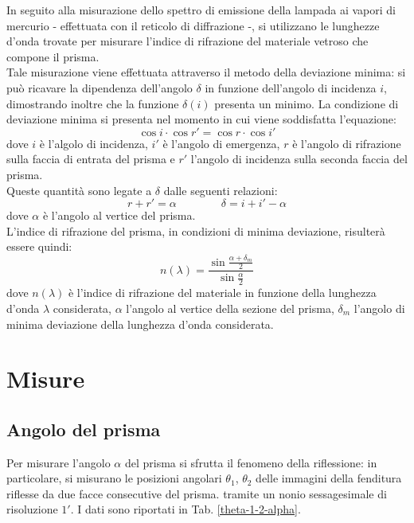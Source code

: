 \documentclass[]{article}
\let\oldsection\section%
\renewcommand{\section}{%
	\renewcommand{\theequation}{\thesection.\arabic{equation}}%
	\oldsection}%
\let\oldsubsection\subsection%
\renewcommand{\subsection}{%
	\renewcommand{\theequation}{\thesubsection.\arabic{equation}}%
	\oldsubsection}%
\begin{document}
    In seguito alla misurazione dello spettro di emissione della lampada ai vapori di mercurio - effettuata con il reticolo di diffrazione -, si utilizzano le lunghezze d'onda trovate per misurare l'indice di rifrazione del materiale vetroso che compone il prisma. \\
    Tale misurazione viene effettuata attraverso il metodo della deviazione minima: si può ricavare la dipendenza dell'angolo $\delta$ in funzione dell'angolo di incidenza $i$, dimostrando inoltre che la funzione $\delta (i)$ presenta un minimo. La condizione di deviazione minima si presenta nel momento in cui viene soddisfatta l'equazione:
    \begin{equation}
        \label{dev_minima}
        \cos i \cdot \cos r' = \cos r \cdot \cos i'
    \end{equation}
    dove $i$ è l'algolo di incidenza, $i'$ è l'angolo di emergenza, $r$ è l'angolo di rifrazione sulla faccia di entrata del prisma e $r'$ l'angolo di incidenza sulla seconda faccia del prisma.\\
    Queste quantità sono legate a $\delta$ dalle seguenti relazioni:
    \begin{equation}
        \label{relazioni_delta}
        r + r' = \alpha \qquad\qquad
        \delta = i + i' - \alpha
    \end{equation}
    dove $\alpha$ è l'angolo al vertice del prisma.\\
    L'indice di rifrazione del prisma, in condizioni di minima deviazione, risulterà essere quindi:
    \begin{equation}
        \label{indice_rifrazione}
        n(\lambda)=\frac{\sin \frac{\alpha + \delta _m} {2}}{\sin \frac{\alpha}{2}}
    \end{equation}
    dove $n(\lambda)$ è l'indice di rifrazione del materiale in funzione della lunghezza d'onda $\lambda$ considerata, $\alpha$ l'angolo al vertice della sezione del prisma, $\delta _m $ l'angolo di minima deviazione della lunghezza d'onda considerata.

    \section{Misure}
    \label{par:misure}

    \subsection{Angolo del prisma}
    Per misurare l'angolo $\alpha$ del prisma si sfrutta il fenomeno della riflessione: in particolare, si misurano le posizioni angolari $\theta_1$, $\theta_2$ delle immagini della fenditura riflesse da due facce consecutive del prisma. tramite un nonio sessagesimale di risoluzione $1'$. I dati sono riportati in Tab. \ref{theta-1-2-alpha}.
\end{document}
